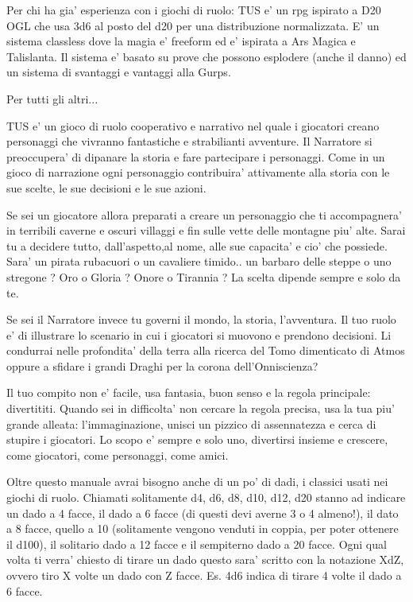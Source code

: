 \documentclass[a4paper,11pt,twoside,openany]{book}
\begin{document}
	Per chi ha gia' esperienza con i giochi di ruolo: TUS e' un rpg ispirato a D20 OGL che usa 3d6 al posto del d20 per una distribuzione normalizzata. E' un sistema classless dove la magia e' freeform ed e' ispirata a Ars Magica e Talislanta. Il sistema e' basato su prove che possono esplodere (anche il danno) ed un sistema di svantaggi e vantaggi alla Gurps. 
	
	Per tutti gli altri...
	
	TUS e' un gioco di ruolo cooperativo e narrativo nel quale i giocatori creano personaggi che vivranno fantastiche e strabilianti avventure. Il Narratore si preoccupera' di dipanare la storia e fare partecipare i personaggi. Come in un gioco di narrazione ogni personaggio contribuira' attivamente alla storia con le sue scelte, le sue decisioni e le sue azioni.
	
	Se sei un giocatore allora preparati a creare un personaggio che ti accompagnera' in terribili caverne e oscuri villaggi e fin sulle vette delle montagne piu' alte. Sarai tu a decidere tutto, dall'aspetto,al nome, alle sue capacita' e cio' che possiede. Sara' un pirata rubacuori o un cavaliere timido.. un barbaro delle steppe o uno stregone ? Oro o Gloria ? Onore o Tirannia ? La scelta dipende sempre e solo da te.
	
	Se sei il Narratore invece tu governi il mondo, la storia, l'avventura. Il tuo ruolo e' di illustrare lo scenario in cui i giocatori si muovono e prendono decisioni. Li condurrai nelle profondita' della terra alla ricerca del Tomo dimenticato di Atmos oppure a sfidare i grandi Draghi per la corona dell'Onniscienza?
	
	Il tuo compito non e' facile, usa fantasia, buon senso e la regola principale: divertititi. Quando sei in difficolta' non cercare la regola precisa, usa la tua piu' grande alleata: l'immaginazione, unisci un pizzico di assennatezza e cerca di stupire i giocatori. Lo scopo e' sempre e solo uno, divertirsi insieme e crescere, come giocatori, come personaggi, come amici.
	
	Oltre questo manuale avrai bisogno anche di un po' di dadi, i classici usati nei giochi di ruolo.
	Chiamati solitamente d4, d6, d8, d10, d12, d20 stanno ad indicare un dado a 4 facce, il dado a 6 facce (di questi devi averne 3 o 4 almeno!), il dato a 8 facce, quello a 10 (solitamente vengono venduti in coppia, per poter ottenere il d100), il solitario dado a 12 facce e il sempiterno dado a 20 facce.
	Ogni qual volta ti verra' chiesto di tirare un dado questo sara' scritto con la notazione XdZ, ovvero tiro X volte un dado con Z facce. Es. 4d6 indica di tirare 4 volte il dado a 6 facce.
	
\end{document}
